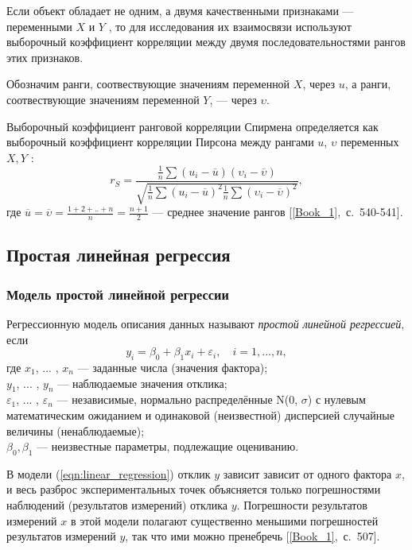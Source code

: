 \documentclass[12pt,a4paper]{article}
\begin{document}
			Если объект обладает не одним, а двумя качественными признаками --- переменными $X$ и $Y$ , то для исследования их взаимосвязи используют выборочный коэффициент корреляции между двумя последовательностями рангов этих признаков.
			
			Обозначим ранги, соотвествующие значениям переменной $X$, через $u$, а ранги, соотвествующие значениям переменной $Y$, --- через $\upsilon$.
			
			Выборочный коэффициент ранговой корреляции Спирмена определяется как выборочный коэффициент корреляции Пирсона между рангами $u$, $\upsilon$ переменных $X, Y$ :
			\begin{equation}\label{eqn:sperman}
			r_S = \frac{\frac{1}{n} \sum(u_i - \overline{u})(\upsilon_i - \overline{\upsilon})}{\sqrt{\frac{1}{n} \sum (u_i - \overline{u})^2 \frac{1}{n} \sum(\upsilon_i - \overline{\upsilon})^2}},
			\end{equation}
			где $\overline{u} = \overline{\upsilon} = \frac{1 + 2 + .. + n}{n} = \frac{n + 1}{2}$ --- среднее значение рангов [\ref{Book_1},~с.~540-541].	
	\subsection{Простая линейная регрессия}
		\subsubsection{Модель простой линейной регрессии}
			Регрессионную модель описания данных называют \emph{простой линейной регрессией}, если
			\begin{equation}\label{eqn:linear_regression}
			y_i = \beta_0 + \beta_1x_i + \varepsilon_i, \quad i = 1, ... , n,
			\end{equation}
			где $x_1$, ... , $x_n$ --- заданные числа (значения фактора);\\
			$y_1$, ... , $y_n$ --- наблюдаемые значения отклика;\\ $\varepsilon_1$, ... , $\varepsilon_n$ — независимые, нормально распределённые N(0, $\sigma$) с нулевым математическим ожиданием и одинаковой (неизвестной) дисперсией случайные величины (ненаблюдаемые);\\ $\beta_0, \beta_1$ — неизвестные параметры, подлежащие оцениванию.
			
			В модели (\ref{eqn:linear_regression}) отклик $y$ зависит зависит от одного фактора $x$, и весь разброс экспериментальных точек объясняется только погрешностями наблюдений (результатов измерений) отклика $y$. Погрешности результатов измерений $x$ в этой модели полагают существенно меньшими погрешностей результатов измерений $y$, так что ими можно пренебречь [\ref{Book_1},~с.~507].
			
\end{document}

